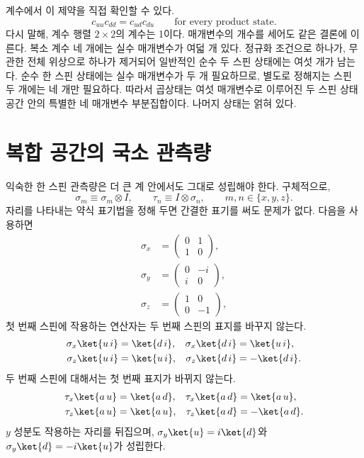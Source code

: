 계수에서 이 제약을 직접 확인할 수 있다.
\begin{equation}
c_{uu}c_{dd}=c_{ud}c_{du}
\qquad\text{for every product state}.
\label{eq:l6-rank-one-condition}
\end{equation}
다시 말해, 계수 행렬 \(2\times2\)의 계수는 1이다. 매개변수의 개수를 세어도 같은 결론에 이른다. 복소 계수 네 개에는 실수 매개변수가 여덟 개 있다. 정규화 조건으로 하나가, 무관한 전체 위상으로 하나가 제거되어 일반적인 순수 두 스핀 상태에는 여섯 개가 남는다. 순수 한 스핀 상태에는 실수 매개변수가 두 개 필요하므로, 별도로 정해지는 스핀 두 개에는 네 개만 필요하다. 따라서 곱상태는 여섯 매개변수로 이루어진 두 스핀 상태 공간 안의 특별한 네 매개변수 부분집합이다. 나머지 상태는 얽혀 있다.

\section{복합 공간의 국소 관측량}

익숙한 한 스핀 관측량은 더 큰 계 안에서도 그대로 성립해야 한다. 구체적으로,
\begin{equation}
\sigma_m\equiv\sigma_m\otimes I,
\qquad
\tau_n\equiv I\otimes\sigma_n,
\qquad
m,n\in\{x,y,z\}.
\label{eq:l6-local-operators}
\end{equation}
자리를 나타내는 약식 표기법을 정해 두면 간결한 표기를 써도 문제가 없다. 다음을 사용하면
\begin{equation}
\begin{aligned}
\sigma_x&=
\begin{pmatrix}0&1\\1&0\end{pmatrix},\\[0.4em]
\sigma_y&=
\begin{pmatrix}0&-i\\i&0\end{pmatrix},\\[0.4em]
\sigma_z&=
\begin{pmatrix}1&0\\0&-1\end{pmatrix},
\end{aligned}
\end{equation}
첫 번째 스핀에 작용하는 연산자는 두 번째 스핀의 표지를 바꾸지 않는다.
\begin{align}
\sigma_x\ket{u\,i}&=\ket{d\,i},
&
\sigma_x\ket{d\,i}&=\ket{u\,i},\\
\sigma_z\ket{u\,i}&=\ket{u\,i},
&
\sigma_z\ket{d\,i}&=-\ket{d\,i}.
\end{align}
두 번째 스핀에 대해서는 첫 번째 표지가 바뀌지 않는다.
\begin{align}
\tau_x\ket{a\,u}&=\ket{a\,d},
&
\tau_x\ket{a\,d}&=\ket{a\,u},\\
\tau_z\ket{a\,u}&=\ket{a\,u},
&
\tau_z\ket{a\,d}&=-\ket{a\,d}.
\label{eq:l6-spectator-action}
\end{align}
\(y\) 성분도 작용하는 자리를 뒤집으며,
\(\sigma_y\ket{u}=i\ket{d}\)와
\(\sigma_y\ket{d}=-i\ket{u}\)가 성립한다.

